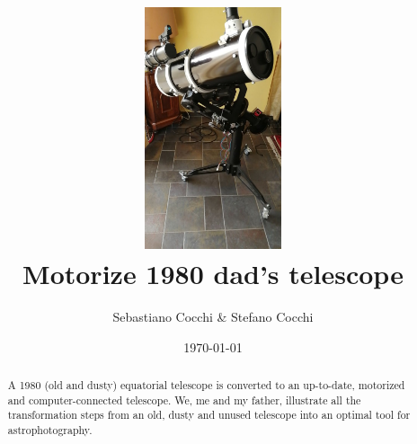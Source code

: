 \documentclass{article}
\title{\includegraphics[width=4cm]{telescope_image.jpg} \\ Motorize 1980 dad's telescope}
\author{Sebastiano Cocchi \& Stefano Cocchi}
\date{\today}
\begin{document}
    
    \maketitle

    \begin{abstract}
        A 1980 (old and dusty) equatorial telescope is converted to an up-to-date, motorized and computer-connected telescope.
        We, me and my father, illustrate all the transformation steps from an old, dusty and unused telescope into an optimal tool for astrophotography.
    \end{abstract}

    \tableofcontents

\end{document}
